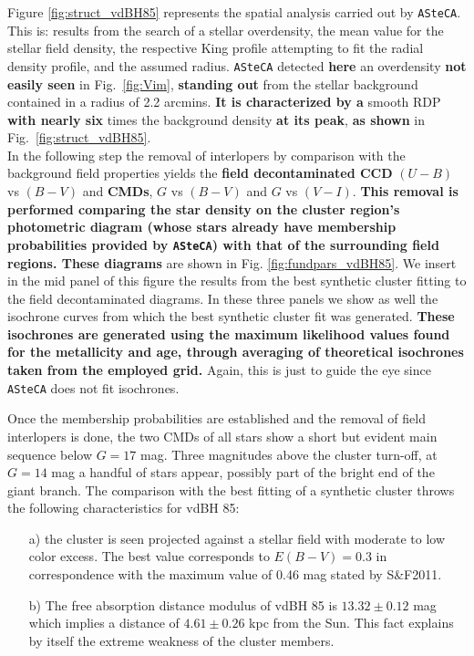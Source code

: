 \documentclass[referee]{aa}
\begin{document}
Figure \ref{fig:struct_vdBH85} represents the spatial analysis carried
out by \texttt{ASteCA}. This is: results from the search of a stellar
overdensity, the mean value for the stellar field density, the respective King
profile attempting to fit the radial density profile, and the assumed radius.
%
\texttt{ASteCA} detected \textbf{here} an overdensity \textbf{not easily seen} in
Fig.~\ref{fig:Vim}, \textbf{standing out} from the stellar background contained
in a radius of 2.2 arcmins. \textbf{It is characterized by a} smooth RDP 
\textbf{with nearly six} times the background density \textbf{at its peak}, 
\textbf{as shown} in Fig.~\ref{fig:struct_vdBH85}.\\

In the following step the removal of interlopers by comparison with the
background field properties yields the \textbf{field decontaminated CCD}
$(U-B)$ vs $(B-V)$ and \textbf{CMDs}, $G$ vs $(B-V)$ and $G$ vs $(V-I)$.
\textbf{This removal is performed comparing the star density on the cluster
region's photometric diagram (whose stars already have membership
probabilities provided by \texttt{ASteCA}) with that of the surrounding field
regions. These diagrams} are shown in Fig. \ref{fig:fundpars_vdBH85}.
%
We insert in the mid panel of this figure the results from the
best synthetic cluster fitting to the field decontaminated diagrams. In these
three panels we show as well the isochrone curves from which the best
synthetic cluster fit was generated. \textbf{These isochrones are generated
using the maximum likelihood values found for the metallicity and age, through
averaging of theoretical isochrones taken from the employed grid.}
Again, this is just to guide the eye since \texttt{ASteCA} does not fit
isochrones.

Once the membership probabilities are established and the removal of field
interlopers is done, the two CMDs of all stars show a short but evident main
sequence below $G=17$ mag.
Three magnitudes above the cluster turn-off, at $G=14$ mag a handful of stars
appear, possibly part of the bright end of the giant branch. The comparison
with the best fitting of a synthetic cluster throws the following
characteristics for vdBH 85:

\begin{itemize}
\item [a)] the cluster is seen projected against a stellar field with moderate
    to low color excess. The best value corresponds to $E(B-V)=0.3$ in
    correspondence with the maximum value of 0.46 mag stated by S\&F2011.
\item [b)] The free absorption distance modulus of vdBH 85 is
    $13.32\pm0.12$ mag which implies a distance of $4.61\pm0.26$ kpc
    from the Sun. This fact explains by itself the extreme weakness of the
    cluster members.
\end{itemize}
\end{document}
